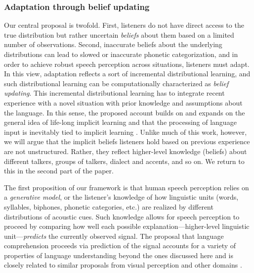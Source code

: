 \subsubsection{Adaptation through belief updating}
\label{sec:robust-speech-perc}



Our central proposal is twofold.  First, listeners do not have direct access to the true distribution but rather uncertain \emph{beliefs} about them based on a limited number of observations.  Second, inaccurate beliefs about the underlying distributions can lead to slowed or inaccurate phonetic categorization, and in order to achieve robust speech perception across situations, listeners must adapt.  In this view, adaptation reflects a sort of incremental distributional learning,
and such distributional learning can be computationally characterized as \emph{belief updating}. This incremental distributional learning has to integrate recent experience with a novel situation with prior knowledge and assumptions about the language. In this sense, the proposed account builds on and expands on the general idea of life-long implicit learning \autocite{Botvinick2004,Chang2006,Elman1990} and that the processing of language input is inevitably tied to implicit learning \autocite[e.g.,][]{Clark2013,Dell2014,Jaeger2013a}. Unlike much of this work, however, we will argue that the implicit beliefs listeners hold based on previous experience are not unstructured. Rather, they reflect higher-level knowledge (beliefs) about different talkers, groups of talkers, dialect and accents, and so on.  We return to this in the second part of the paper.

The first proposition of our framework is that human speech perception relies on a \emph{generative model}, or the listener's knowledge of how linguistic units (words, syllables, biphones, phonetic categories, etc.) are realized by different distributions of acoustic cues.  Such knowledge allows for speech perception to proceed by comparing how well each possible explanation---higher-level linguistic unit---\emph{predicts} the currently observed signal.  The proposal that language comprehension proceeds via prediction of the signal accounts for a variety of properties of language understanding beyond the ones discussed here \autocite[cf.][]{Dell2014,Farmer2013,Jaeger2013a,MacDonald2013,Pickering2013} and is closely related to similar proposals from visual perception and other domains \autocite{Clark2013,Friston2005,Hinton2007,Huang2011,Rao1999}.

